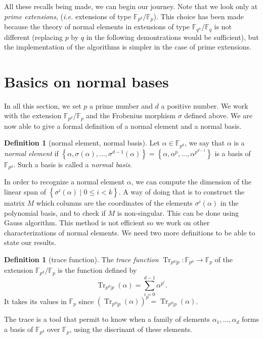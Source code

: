\documentclass[a4paper,11pt]{article}
\theoremstyle{break}
\theoremstyle{sc}
\theoremstyle{definition}
\newtheorem{defi}[thm]{Definition}
\theoremstyle{remark}
\DeclareMathOperator{\Tr}{Tr}
\newcommand{\ie}{\emph{i.e. }}
\begin{document}
All these recalls being made, we can begin our journey. Note that we look only
at \emph{prime extensions}, (\ie extensions of type
$\mathbb{F}_{p^d}/\mathbb{F}_p$). This choice has been made because the theory
of normal elements in extensions of type $\mathbb{F}_{q^n}/\mathbb{F}_q$ is not
different (replacing $p$ by $q$ in the following demontrations would be
sufficient), but the implementation of the algorithms is simpler in the case of
prime extensions.

\section{Basics on normal bases}

In all this section, we set $p$ a prime number and $d$ a positive number. We
work with the extension $\mathbb{F}_{p^d}/\mathbb{F}_p$ and the Frobenius
morphism $\sigma$ defined above. We are now able to give a formal definition
of a normal element and a normal basis.

\begin{defi}[normal element, normal basis]
  Let $\alpha\in\mathbb{F}_{p^d}$, we say that $\alpha$ is a \emph{normal
  element} if $\left\{ \alpha, \sigma(\alpha),\dots,\sigma^{d-1}(\alpha)
  \right\}=\left\{ \alpha, \alpha^{p}, \dots, \alpha^{p^{d-1}} \right\}$ is a
  basis of $\mathbb{F}_{p^d}$. Such a basis is called a \emph{normal basis}. 
\end{defi}

In order to recognize a normal element $\alpha$, we can compute the dimension of the
linear span of $\left\{ \sigma^i(\alpha) \;|\; 0\leq i < k \right\}$. A way of
doing that is to construct the matrix $M$ which columns are the coordinates of the
elements $\sigma^i(\alpha)$ in the polynomial basis, and to check if $M$ is
non-singular. This can be done using Gauss algorithm. This method is not
efficient so we work on other characterizations of normal elements. We need
two more definitions to be able to state our results.

\begin{defi}[trace function]
  The \emph{trace function}
  $\Tr_{p^d|p}:\mathbb{F}_{p^d}\to\mathbb{F}_p$ of the extension
$\mathbb{F}_{p^d}/\mathbb{F}_p$ is the function defined by
\[
  \Tr_{p^d|p}(\alpha) = \sum_{i=0}^{d-1}\alpha^{p^i}.
\]
It takes its values in $\mathbb{F}_p$ since $(\Tr_{p^d|p}(\alpha))^p
= \Tr_{p^d|p}(\alpha)$. 
\end{defi}

The trace is a tool that permit to know when a family of elements $\alpha_1,
\dots, \alpha_d$ forms a basis of $\mathbb{F}_{p^d}$ over
$\mathbb{F}_p$, using the discrinant of these elements.
\end{document}
